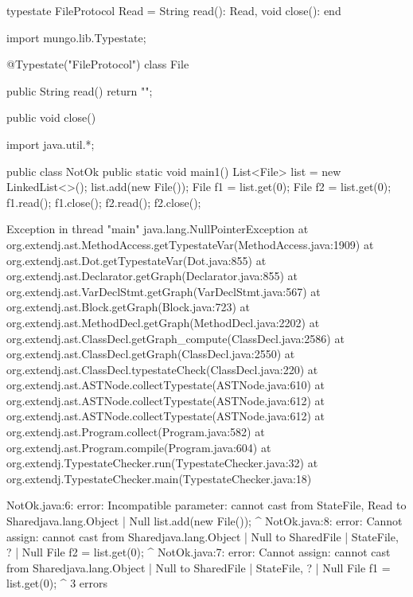 \begin{code}
typestate FileProtocol {
  Read = {
    String read(): Read,
    void close(): end
  }
}\end{code}

\begin{code}
import mungo.lib.Typestate;

@Typestate("FileProtocol")
class File {

  public String read() {
    return "";
  }

  public void close() {
  }

}\end{code}

\begin{code}
import java.util.*;

public class NotOk {
  public static void main1() {
    List<File> list = new LinkedList<>();
    list.add(new File());
    File f1 = list.get(0);
    File f2 = list.get(0);
    f1.read();
    f1.close();
    f2.read();
    f2.close();
  }
}\end{code}

\lstset{language=,caption=Mungo's output}
\begin{code}
Exception in thread "main" java.lang.NullPointerException
	at org.extendj.ast.MethodAccess.getTypestateVar(MethodAccess.java:1909)
	at org.extendj.ast.Dot.getTypestateVar(Dot.java:855)
	at org.extendj.ast.Declarator.getGraph(Declarator.java:855)
	at org.extendj.ast.VarDeclStmt.getGraph(VarDeclStmt.java:567)
	at org.extendj.ast.Block.getGraph(Block.java:723)
	at org.extendj.ast.MethodDecl.getGraph(MethodDecl.java:2202)
	at org.extendj.ast.ClassDecl.getGraph_compute(ClassDecl.java:2586)
	at org.extendj.ast.ClassDecl.getGraph(ClassDecl.java:2550)
	at org.extendj.ast.ClassDecl.typestateCheck(ClassDecl.java:220)
	at org.extendj.ast.ASTNode.collectTypestate(ASTNode.java:610)
	at org.extendj.ast.ASTNode.collectTypestate(ASTNode.java:612)
	at org.extendj.ast.ASTNode.collectTypestate(ASTNode.java:612)
	at org.extendj.ast.Program.collect(Program.java:582)
	at org.extendj.ast.Program.compile(Program.java:604)
	at org.extendj.TypestateChecker.run(TypestateChecker.java:32)
	at org.extendj.TypestateChecker.main(TypestateChecker.java:18)
\end{code}

\lstset{language=,caption=Our tool's output}
\begin{code}
NotOk.java:6: error: Incompatible parameter: cannot cast from State{File, Read} to Shared{java.lang.Object} | Null
    list.add(new File());
             ^
NotOk.java:8: error: Cannot assign: cannot cast from Shared{java.lang.Object} | Null to Shared{File} | State{File, ?} | Null
    File f2 = list.get(0);
         ^
NotOk.java:7: error: Cannot assign: cannot cast from Shared{java.lang.Object} | Null to Shared{File} | State{File, ?} | Null
    File f1 = list.get(0);
         ^
3 errors
\end{code}

